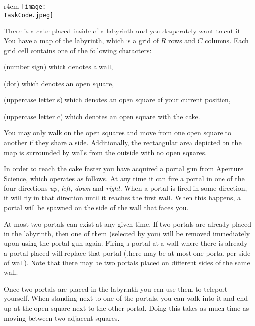 \documentclass{boi2014}
\renewcommand{\TaskCode}{portals}
\newcommand{\constant}[1]{{\tt #1}}
\begin{document}
    \begin{wrapfigure}[4]{r}{4cm}
        \vspace{-24pt}
		\texttt{[image: \\TaskCode.jpeg]}
	\end{wrapfigure}

    There is a cake placed inside of a labyrinth and you desperately want to eat
    it. You have a map of the labyrinth, which is a grid of $R$ rows and $C$
    columns.  Each grid cell contains one of the following characters:
    \begin{description}[itemindent=1pt]
    	\item[\constant{\#}] (number sign) which denotes a wall,
        \item[\constant{.}] (dot) which denotes an open square,
        \item[\constant{S}] (uppercase letter s) which denotes an open square of
        your current position,
        \item[\constant{C}] (uppercase letter c) which denotes an open square
        with the cake.
    \end{description}

    You may only walk on the open squares and move from one open square to
    another if they share a side. Additionally, the rectangular area depicted on
    the map is surrounded by walls from the outside with no open squares.

    In order to reach the cake faster you have acquired a portal gun from
    Aperture Science\texttrademark{}, which operates as follows.
    At any time it can fire a portal in one of the four directions
    \emph{up}, \emph{left}, \emph{down} and \emph{right}.
    When a portal is fired in some direction, it will fly in that direction
    until it reaches the first wall. When this happens, a portal
    will be spawned on the side of the wall that faces you.

    At most two portals can exist at any given time. If two portals are already
    placed in the labyrinth, then one of them (selected by you) will be removed
    immediately upon using the portal gun again. Firing a portal at a wall where
    there is already a portal placed will replace that portal (there may be at
    most one portal per side of wall).  Note that there may be two portals
    placed on different sides of the same wall.

    Once two portals are placed in the labyrinth you can use them to
    teleport yourself. When standing next to one of the portals,
    you can walk into it and end up at the open square next to the other
    portal. Doing this takes as much time as moving between two
    adjacent squares.
\end{document}

